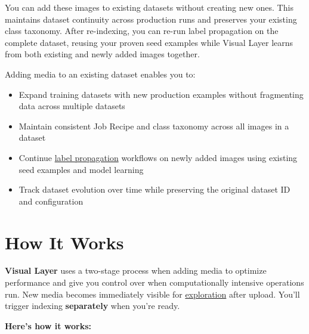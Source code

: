 \documentclass[
  11pt,
  a4paper,
  11pt,
  oneside]{report}
\providecommand{\tightlist}{%
  \setlength{\itemsep}{0pt}\setlength{\parskip}{0pt}}
\renewcommand{\arraystretch}{1.3}
\renewcommand{\arraystretch}{1.3}     %
\begin{document}
You can add these images to existing datasets without creating new ones.
This maintains dataset continuity across production runs and preserves
your existing class taxonomy. After re-indexing, you can re-run label
propagation on the complete dataset, reusing your proven seed examples
while Visual Layer learns from both existing and newly added images
together.

Adding media to an existing dataset enables you to:

\begin{itemize}
\tightlist
\item
  Expand training datasets with new production examples without
  fragmenting data across multiple datasets
\item
  Maintain consistent Job Recipe and class taxonomy across all images in
  a dataset
\item
  Continue \hyperref[re-indexing-the-updated-dataset]{label propagation}
  workflows on newly added images using existing seed examples and model
  learning
\item
  Track dataset evolution over time while preserving the original
  dataset ID and configuration
\end{itemize}

\section{How It Works}\label{how-it-works}

\textbf{Visual Layer} uses a two-stage process when adding media to
optimize performance and give you control over when computationally
intensive operations run. New media becomes immediately visible for
\hyperref[adding-media-to-an-existing-dataset]{exploration} after
upload. You'll trigger indexing \textbf{separately} when you're ready.

\newpage

\textbf{Here's how it works:}

\renewcommand{\arraystretch}{1.5}
\end{document}
